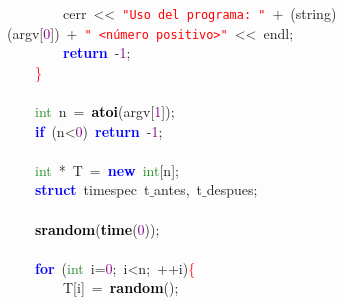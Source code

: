 \mbox{}\ \ \ \ \ \ \ \ cerr\ \textcolor{BrickRed}{\textless{}\textless{}}\ \texttt{\textcolor{Red}{"{}Uso\ del\ programa:\ "{}}}\ \textcolor{BrickRed}{+}\ \textcolor{BrickRed}{(}string\textcolor{BrickRed}{)(}argv\textcolor{BrickRed}{[}\textcolor{Purple}{0}\textcolor{BrickRed}{])}\ \textcolor{BrickRed}{+}\ \texttt{\textcolor{Red}{"{}\ \textless{}número\ positivo\textgreater{}"{}}}\ \textcolor{BrickRed}{\textless{}\textless{}}\ endl\textcolor{BrickRed}{;}\ \  \\
\mbox{}\ \ \ \ \ \ \ \ \textbf{\textcolor{Blue}{return}}\ \textcolor{BrickRed}{-}\textcolor{Purple}{1}\textcolor{BrickRed}{;} \\
\mbox{}\ \ \ \ \textcolor{Red}{\}} \\
\mbox{} \\
\mbox{}\ \ \ \ \textcolor{ForestGreen}{int}\ n\ \textcolor{BrickRed}{=}\ \textbf{\textcolor{Black}{atoi}}\textcolor{BrickRed}{(}argv\textcolor{BrickRed}{[}\textcolor{Purple}{1}\textcolor{BrickRed}{]);}\ \ \ \  \\
\mbox{}\ \ \ \ \textbf{\textcolor{Blue}{if}}\ \textcolor{BrickRed}{(}n\textcolor{BrickRed}{\textless{}}\textcolor{Purple}{0}\textcolor{BrickRed}{)}\ \textbf{\textcolor{Blue}{return}}\ \textcolor{BrickRed}{-}\textcolor{Purple}{1}\textcolor{BrickRed}{;} \\
\mbox{}\ \ \ \  \\
\mbox{}\ \ \ \ \textcolor{ForestGreen}{int}\ \textcolor{BrickRed}{*}\ T\ \textcolor{BrickRed}{=}\ \textbf{\textcolor{Blue}{new}}\ \textcolor{ForestGreen}{int}\textcolor{BrickRed}{[}n\textcolor{BrickRed}{];} \\
\mbox{}\ \ \ \ \textbf{\textcolor{Blue}{struct}}\ \textcolor{TealBlue}{timespec}\ t$\_$antes\textcolor{BrickRed}{,}\ t$\_$despues\textcolor{BrickRed}{;} \\
\mbox{}\ \ \ \  \\
\mbox{}\ \ \ \ \textbf{\textcolor{Black}{srandom}}\textcolor{BrickRed}{(}\textbf{\textcolor{Black}{time}}\textcolor{BrickRed}{(}\textcolor{Purple}{0}\textcolor{BrickRed}{));} \\
\mbox{}\ \ \ \  \\
\mbox{}\ \ \ \ \textbf{\textcolor{Blue}{for}}\ \textcolor{BrickRed}{(}\textcolor{ForestGreen}{int}\ i\textcolor{BrickRed}{=}\textcolor{Purple}{0}\textcolor{BrickRed}{;}\ i\textcolor{BrickRed}{\textless{}}n\textcolor{BrickRed}{;}\ \textcolor{BrickRed}{++}i\textcolor{BrickRed}{)}\textcolor{Red}{\{} \\
\mbox{}\ \ \ \ \ \ \ \ T\textcolor{BrickRed}{[}i\textcolor{BrickRed}{]}\ \textcolor{BrickRed}{=}\ \textbf{\textcolor{Black}{random}}\textcolor{BrickRed}{();} \\
